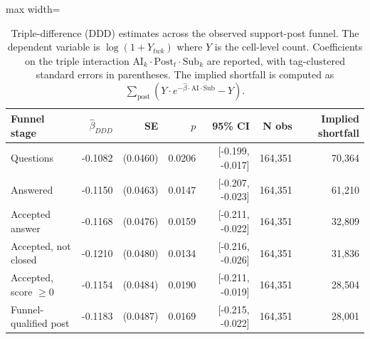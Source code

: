 \begin{table}[ht]
\centering
\caption{Triple-difference (DDD) estimates across the observed support-post funnel. The dependent variable is $\log(1+Y_{twk})$ where $Y$ is the cell-level count. Coefficients on the triple interaction $\text{AI}_k \cdot \text{Post}_t \cdot \text{Sub}_k$ are reported, with tag-clustered standard errors in parentheses. The implied shortfall is computed as $\sum_{\text{post}}(Y \cdot e^{-\hat\beta \cdot \text{AI} \cdot \text{Sub}} - Y)$.}
\label{tab:reusable_funnel}
\small
\setlength{\tabcolsep}{4pt}
\begin{adjustbox}{max width=\textwidth}
\begin{tabular}{lrrrrrr}
\toprule
Funnel stage & $\hat\beta_{DDD}$ & SE & $p$ & 95\% CI & N obs & Implied shortfall \\
\midrule
Questions & -0.1082 & (0.0460) & 0.0206 & [-0.199, -0.017] & 164,351 & 70,364 \\
Answered & -0.1150 & (0.0463) & 0.0147 & [-0.207, -0.023] & 164,351 & 61,210 \\
Accepted answer & -0.1168 & (0.0476) & 0.0159 & [-0.211, -0.022] & 164,351 & 32,809 \\
Accepted, not closed & -0.1210 & (0.0480) & 0.0134 & [-0.216, -0.026] & 164,351 & 31,836 \\
Accepted, score $\geq 0$ & -0.1154 & (0.0484) & 0.0190 & [-0.211, -0.019] & 164,351 & 28,504 \\
Funnel-qualified post & -0.1183 & (0.0487) & 0.0169 & [-0.215, -0.022] & 164,351 & 28,001 \\
\bottomrule
\end{tabular}
\end{adjustbox}
\end{table}
